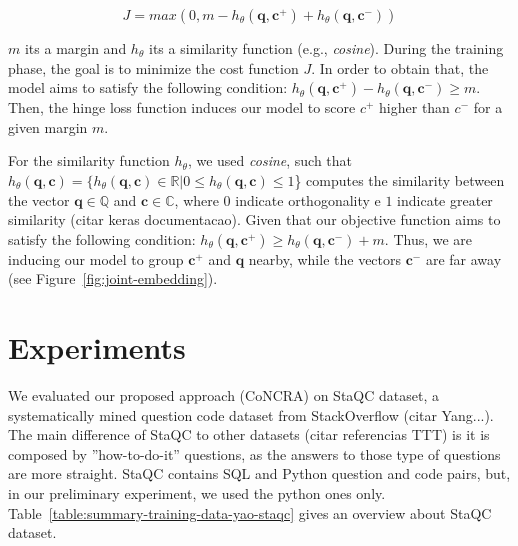 \documentclass[sigconf]{acmart}
\begin{document}
\begin{equation}
J = max(0, m - h_{\theta}(\bm{q}, \bm{c^{+}}) + h_{\theta}(\bm{q}, \bm{c^{-}}))
\end{equation}

$m$ its a margin and $h_{\theta}$ its a similarity function (e.g., \textit{cosine}). During the training phase, the goal is to minimize the cost function $J$. In order to obtain that, the model aims to satisfy the following condition: $h_{\theta}(\bm{q}, \bm{c^{+}}) - h_{\theta}(\bm{q}, \bm{c^{-}}) \geq m$. Then, the hinge loss function induces our model to score $c^{+}$ higher than $c^{-}$ for a given margin $m$. 

For the similarity function $h_{\theta}$, we used \emph{cosine}, such that $h_{\theta}(\bm{q}, \bm{c}) = \{h_{\theta}(\bm{q}, \bm{c}) \in \mathbb{R} | 0 \leq h_{\theta}(\bm{q}, \bm{c}) \leq 1$\} computes the similarity between the vector $\bm{q} \in \mathbb{Q}$ and $\bm{c} \in \mathbb{C}$, where $0$ indicate orthogonality e $1$ indicate greater similarity (citar keras documentacao).  Given that our objective function aims to satisfy the following condition: $h_{\theta}(\bm{q}, \bm{c^{+}}) \geq h_{\theta}(\bm{q}, \bm{c^{-}}) + m$. Thus, we are inducing our model to group $\bm{c^{+}}$ and $\bm{q}$ nearby, while the vectors $\bm{c^{-}}$ are far away (see Figure~\ref{fig:joint-embedding}). 

\section{Experiments}

We evaluated our proposed approach (CoNCRA) on StaQC dataset, a systematically mined question code dataset from StackOverflow (citar Yang...). The main difference of StaQC to other datasets (citar referencias TTT) is it is composed by ''how-to-do-it'' questions, as the answers to those type of questions are more straight. StaQC contains SQL and Python question and code pairs, but, in our preliminary experiment, we used the python ones only. Table~\ref{table:summary-training-data-yao-staqc} gives an overview about StaQC dataset.
\end{document}
